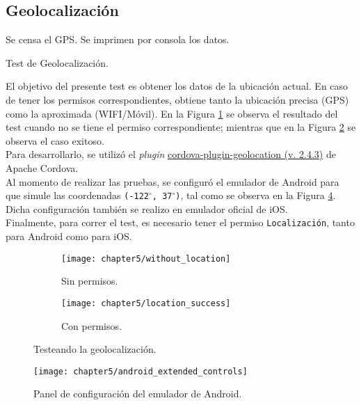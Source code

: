 \subsection{Geolocalización}
\begin{algorithm}
	\begin{algorithmic}[1]
		\STATE Se censa el GPS.
		\STATE Se imprimen por consola los datos.
	\end{algorithmic}
	\caption{Test de Geolocalización.}\label{alg:chap5:test_geolocalizacion}
\end{algorithm}
El objetivo del presente test es obtener los datos de la ubicación actual. En caso de tener los permisos correspondientes, obtiene tanto la ubicación precisa (GPS) como la aproximada (WIFI/Móvil). En la Figura \ref{fig:ch05:without_location} se observa el resultado del test cuando no se tiene el permiso correspondiente; mientras que en la Figura \ref{fig:ch05:with_location} se observa el caso exitoso.\\

Para desarrollarlo, se utilizó el \textit{plugin} \href{https://github.com/apache/cordova-plugin-geolocation}{cordova-plugin-geolocation (v. 2.4.3)} de Apache Cordova.\\

Al momento de realizar las pruebas, se configuró el emulador de Android para que simule las coordenadas \texttt{(-122$^\circ$, 37$^\circ$)}, tal como se observa en la Figura \ref{fig:ch05:android_extended_controls}. Dicha configuración también se realizo en emulador oficial de iOS.\\

Finalmente, para correr el test, es necesario tener el permiso \texttt{Localización}, tanto para Android como para iOS.
\begin{figure}[htbp]
    \centering
	\begin{subfigure}{0.3\linewidth}
		\texttt{[image: chapter5/without\_location]}
		\caption{Sin permisos.}
		\label{fig:ch05:without_location}
	\end{subfigure}
	\begin{subfigure}{0.3\linewidth}
		\texttt{[image: chapter5/location\_success]}
		\caption{Con permisos.}
		\label{fig:ch05:with_location}
	\end{subfigure}
	\caption{Testeando la geolocalización.}
	\label{fig:ch05:geolocation-cases}
\end{figure}
\begin{figure}[hbtp]
    \centering
	\texttt{[image: chapter5/android\_extended\_controls]}
	\caption{Panel de configuración del emulador de Android.}
	\label{fig:ch05:android_extended_controls}
\end{figure}
